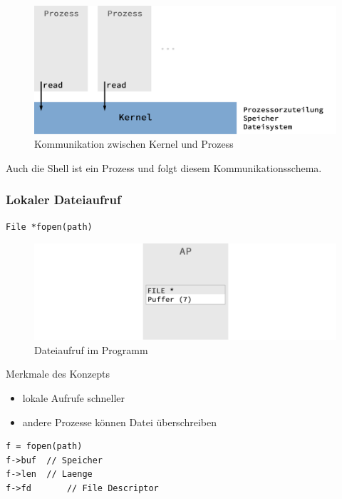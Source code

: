 	\begin{figure}[h]
		\caption{Kommunikation zwischen Kernel und Prozess}
		\includegraphics[width=\textwidth]{workfiles/v2_2}
	\end{figure}
	Auch die Shell ist ein Prozess und folgt diesem Kommunikationsschema.\\

	\subsubsection*{Lokaler Dateiaufruf} %
	\label{ssub:dateiaufrufe}
		
		\begin{lstlisting}
File *fopen(path)
		\end{lstlisting}

		\begin{figure}[h]
			\caption{Dateiaufruf im Programm}
			\includegraphics[width=\textwidth]{workfiles/v2_3}
		\end{figure}

		Merkmale des Konzepts
		\begin{itemize}
			\item lokale Aufrufe schneller
			\item andere Prozesse können Datei überschreiben
		\end{itemize}

		\begin{lstlisting}
f = fopen(path)
f->buf	// Speicher
f->len	// Laenge
f->fd		// File Descriptor
		\end{lstlisting}

